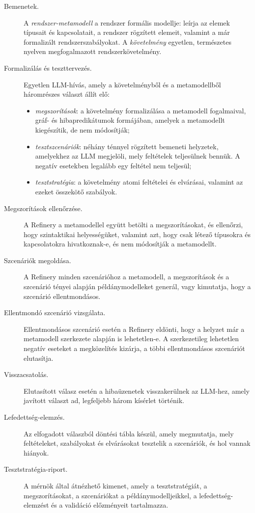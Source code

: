 \begin{description}
	\item[Bemenetek.] A \emph{rendszer-metamodell} a rendszer formális modellje: leírja az elemek típusait és kapcsolatait, a rendszer rögzített elemeit, valamint a már formalizált rendszerszabályokat. A \emph{követelmény} egyetlen, természetes nyelven megfogalmazott rendszerkövetelmény.
	\item[ Formalizálás és teszttervezés.] Egyetlen LLM-hívás, amely a követelményből és a metamodellből háromrészes választ állít elő:
	\begin{itemize}
		\item \emph{megszorítások}: a követelmény formalizálása a metamodell fogalmaival, gráf- és hibapredikátumok formájában, amelyek a metamodellt kiegészítik, de nem módosítják;
		\item \emph{tesztszcenáriók}: néhány ténnyel rögzített bemeneti helyzetek, amelyekhez az LLM megjelöli, mely feltételek teljesülnek bennük. A negatív esetekben legalább egy feltétel nem teljesül;
		\item \emph{tesztstratégia}: a követelmény atomi feltételei és elvárásai, valamint az ezeket összekötő szabályok.
	\end{itemize}
	\item[ Megszorítások ellenőrzése.] A Refinery a metamodellel együtt betölti a megszorításokat, és ellenőrzi, hogy szintaktikai helyességüket, valamint azt, hogy csak létező típusokra és kapcsolatokra hivatkoznak-e, és nem módosítják a metamodellt.
	\item[ Szcenáriók megoldása.] A Refinery minden szcenárióhoz a metamodell, a megszorítások és a szcenárió tényei alapján példánymodelleket generál, vagy kimutatja, hogy a szcenárió ellentmondásos.
	\item[ Ellentmondó szcenárió vizsgálata.] Ellentmondásos szcenárió esetén a Refinery eldönti, hogy a helyzet már a metamodell szerkezete alapján is lehetetlen-e. A szerkezetileg lehetetlen negatív eseteket a megközelítés kizárja, a többi ellentmondásos szcenáriót elutasítja.
	\item[ Visszacsatolás.] Elutasított válasz esetén a hibaüzenetek visszakerülnek az LLM-hez, amely javított választ ad, legfeljebb három kísérlet történik.
	\item[ Lefedettség-elemzés.] Az elfogadott válaszból döntési tábla készül, amely megmutatja, mely feltételeket, szabályokat és elvárásokat tesztelik a szcenáriók, és hol vannak hiányok.
	\item[ Tesztstratégia-riport.] A mérnök által átnézhető kimenet, amely a tesztstratégiát, a megszorításokat, a szcenáriókat a példánymodelljeikkel, a lefedettség-elemzést és a validáció előzményeit tartalmazza.
\end{description}


